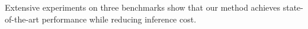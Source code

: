 Extensive experiments on three benchmarks show that our method achieves state-of-the-art performance while reducing inference cost.

